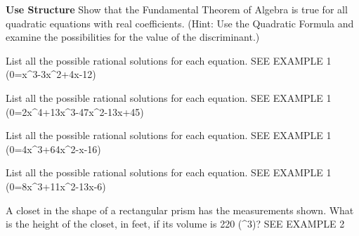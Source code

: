 \documentclass{article}
\newenvironment{practice}[2]{}{}        %
\newcommand{\answer}[1]{}               %
\newcommand{\placeholder}[2]{}          %
\newcommand{\te}[1]{}                   %
\begin{document}
\begin{practice}{19}{2}
\textbf{Use Structure} Show that the Fundamental Theorem of Algebra is true for all quadratic equations with real coefficients. (Hint: Use the Quadratic Formula and examine the possibilities for the value of the discriminant.)
\answer{When (b^2-4ac>0), there are two distinct real roots. When (b^2-4ac=0), there is one real root with multiplicity 2. When (b^2-4ac<0), there are two distinct complex roots.}
\end{practice}
\begin{practice}{20}{1}
List all the possible rational solutions for each equation. SEE EXAMPLE 1
(0=x^3-3x^2+4x-12)
\answer{(\pm\frac{1}{1},\pm\frac{2}{1},\pm\frac{3}{1},\pm\frac{4}{1},\pm\frac{6}{1},\pm\frac{12}{1})}
\end{practice}
\begin{practice}{21}{1}
List all the possible rational solutions for each equation. SEE EXAMPLE 1
(0=2x^4+13x^3-47x^2-13x+45)
\answer{(\pm\frac{1}{1},\pm\frac{1}{2},\pm\frac{3}{1},\pm\frac{3}{2},\pm\frac{5}{1},\pm\frac{5}{2},\pm\frac{9}{1},\pm\frac{9}{2},\pm\frac{15}{1},\pm\frac{15}{2},\pm\frac{45}{1},\pm\frac{45}{2})}
\end{practice}
\begin{practice}{22}{1}
List all the possible rational solutions for each equation. SEE EXAMPLE 1
(0=4x^3+64x^2-x-16)
\answer{(\pm\frac{1}{1},\pm\frac{1}{2},\pm\frac{1}{4},\pm\frac{2}{1},\pm\frac{2}{2},\pm\frac{2}{4},\pm\frac{4}{1},\pm\frac{4}{2},\pm\frac{4}{4},\pm\frac{8}{1},\pm\frac{8}{2},\pm\frac{8}{4},\pm\frac{16}{1},\pm\frac{16}{2},\pm\frac{16}{4})}
\end{practice}
\begin{practice}{23}{1}
List all the possible rational solutions for each equation. SEE EXAMPLE 1
(0=8x^3+11x^2-13x-6)
\answer{(\frac{1}{1},\pm\frac{1}{2},\pm\frac{1}{4},\pm\frac{1}{8},\pm\frac{2}{1},\pm\frac{2}{2},\pm\frac{2}{4},\pm\frac{2}{8},\pm\frac{3}{1},\pm\frac{3}{2},\pm\frac{3}{4},\pm\frac{3}{8},\pm\frac{6}{1},\pm\frac{6}{2},\pm\frac{6}{4},\pm\frac{6}{8})}
\te{The first printed fraction has no plus/minus sign.}
\end{practice}
\begin{practice}{24}{2}
A closet in the shape of a rectangular prism has the measurements shown. What is the height of the closet, in feet, if its volume is 220 (^3)? SEE EXAMPLE 2
\placeholder{illustration}{Closet with clothes, shoes and shelving; height x, front width x+3, depth x-5.5. Black dimension arrows.}
\answer{8 feet}
\end{practice}
\end{document}
